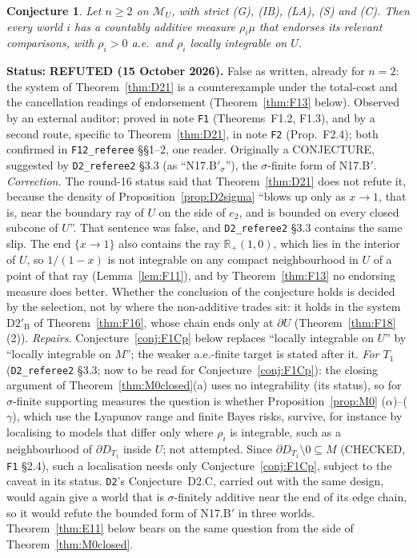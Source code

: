 \documentclass[11pt]{article}
\newtheorem{conjecture}[theorem]{Conjecture}
\theoremstyle{definition}
\theoremstyle{remark}
\newcommand{\R}{\mathbb R}
\newcommand{\M}{\mathcal M}
\newcommand{\src}[1]{\texttt{#1}}
\newcommand{\status}[1]{\par\smallskip\noindent\textbf{Status:} #1\par\smallskip}
\begin{document}
\begin{conjecture}\label{conj:sigmaB}
Let $n\ge2$ on $\M_U$, with strict (G), (IB), (LA), (S) and (C). Then every world $i$ has a countably additive measure $\rho_i\mu$ that endorses its relevant comparisons, with $\rho_i>0$ a.e.\ and $\rho_i$ locally integrable on $U$.
\end{conjecture}
\status{\textbf{REFUTED (15 October 2026).} False as written, already for $n=2$: the system of Theorem~\ref{thm:D21} is a counterexample under the total-cost and the cancellation readings of endorsement (Theorem~\ref{thm:F13} below). Observed by an external auditor; proved in note \src{F1} (Theorems~F1.2, F1.3), and by a second route, specific to Theorem~\ref{thm:D21}, in note \src{F2} (Prop.~F2.4); both confirmed in \src{F12\_referee} \S\S1--2, one reader. Originally a CONJECTURE, suggested by \src{D2\_referee2} \S3.3 (as ``N17.B$'_\sigma$''), the $\sigma$-finite form of N17.B$'$. \emph{Correction.} The round-16 status said that Theorem~\ref{thm:D21} does not refute it, because the density of Proposition~\ref{prop:D2sigma} ``blows up only as $x\to1$, that is, near the boundary ray of $U$ on the side of $e_2$, and is bounded on every closed subcone of $U$''. That sentence was false, and \src{D2\_referee2} \S3.3 contains the same slip. The end $\{x\to1\}$ also contains the ray $\R_+(1,0)$, which lies in the interior of $U$, so $1/(1-x)$ is not integrable on any compact neighbourhood in $U$ of a point of that ray (Lemma~\ref{lem:F11}), and by Theorem~\ref{thm:F13} no endorsing measure does better. Whether the conclusion of the conjecture holds is decided by the selection, not by where the non-additive trades sit: it holds in the system $\mathrm{D2}'_{\mathrm B}$ of Theorem~\ref{thm:F16}, whose chain ends only at $\partial U$ (Theorem~\ref{thm:F18}(2)). \emph{Repairs.} Conjecture~\ref{conj:F1Cp} below replaces ``locally integrable on $U$'' by ``locally integrable on $M$''; the weaker a.e.-finite target is stated after it. \emph{For $T_1$} (\src{D2\_referee2} \S3.3; now to be read for Conjecture~\ref{conj:F1Cp}): the closing argument of Theorem~\ref{thm:M0closed}(a) uses no integrability (its status), so for $\sigma$-finite supporting measures the question is whether Proposition~\ref{prop:M0} ($\alpha$)--($\gamma$), which use the Lyapunov range and finite Bayes risks, survive, for instance by localising to models that differ only where $\rho_i$ is integrable, such as a neighbourhood of $\partial D_{T_1}$ inside $U$; not attempted. Since $\partial D_{T_1}\setminus0\subseteq M$ (CHECKED, \src{F1} \S2.4), such a localisation needs only Conjecture~\ref{conj:F1Cp}, subject to the caveat in its status. \src{D2}'s Conjecture~D2.C, carried out with the same design, would again give a world that is $\sigma$-finitely additive near the end of its edge chain, so it would refute the bounded form of N17.B$'$ in three worlds. Theorem~\ref{thm:E11} below bears on the same question from the side of Theorem~\ref{thm:M0closed}.}
\end{document}
